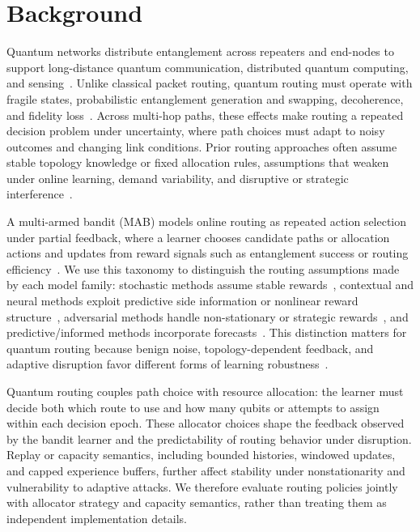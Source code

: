 \documentclass[10pt,conference]{IEEEtran}
\begin{document}
\section{Background}
\label{sec:Background}

Quantum networks distribute entanglement across repeaters and end-nodes to support long-distance quantum communication, distributed quantum computing, and sensing~\cite{wehner2018quantum,kimble2008quantum}. Unlike classical packet routing, quantum routing must operate with fragile states, probabilistic entanglement generation and swapping, decoherence, and fidelity loss~\cite{briegel1998quantum,dahlberg2021netsquid,bennett1993teleporting,zukowski1993event}. Across multi-hop paths, these effects make routing a repeated decision problem under uncertainty, where path choices must adapt to noisy outcomes and changing link conditions. Prior routing approaches often assume stable topology knowledge or fixed allocation rules, assumptions that weaken under online learning, demand variability, and disruptive or strategic interference~\cite{li2025multipath,wang2025learning,huang2024quantum}.

A multi-armed bandit (MAB) models online routing as repeated action selection under partial feedback, where a learner chooses candidate paths or allocation actions and updates from reward signals such as entanglement success or routing efficiency~\cite{lattimore2020bandit,bubeck2012regret}. We use this taxonomy to distinguish the routing assumptions made by each model family: stochastic methods assume stable rewards~\cite{auer2002finite}, contextual and neural methods exploit predictive side information or nonlinear reward structure~\cite{chu2011contextual,zhou2020neuralucb}, adversarial methods handle non-stationary or strategic rewards~\cite{auer2002nonstochastic}, and predictive/informed methods incorporate forecasts~\cite{kar2024icmab}. This distinction matters for quantum routing because benign noise, topology-dependent feedback, and adaptive disruption favor different forms of learning robustness~\cite{huang2024quantum}.

Quantum routing couples path choice with resource allocation: the learner must decide both which route to use and how many qubits or attempts to assign within each decision epoch. These allocator choices shape the feedback observed by the bandit learner and the predictability of routing behavior under disruption. Replay or capacity semantics, including bounded histories, windowed updates, and capped experience buffers, further affect stability under nonstationarity and vulnerability to adaptive attacks. We therefore evaluate routing policies jointly with allocator strategy and capacity semantics, rather than treating them as independent implementation details.
\end{document}
